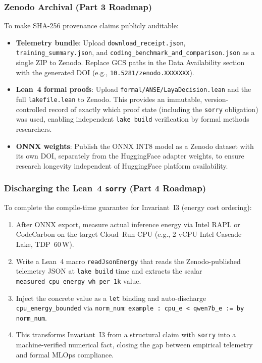 \documentclass[conference]{IEEEtran}
\begin{document}
\subsubsection{Zenodo Archival (Part 3 Roadmap)}

To make SHA-256 provenance claims publicly auditable:
\begin{itemize}
  \item \textbf{Telemetry bundle}: Upload \texttt{download\_receipt.json},
        \texttt{training\_summary.json}, and \texttt{coding\_benchmark\_and\_comparison.json}
        as a single ZIP to Zenodo. Replace GCS paths in the Data Availability section with
        the generated DOI (e.g., \texttt{10.5281/zenodo.XXXXXXX}).
  \item \textbf{Lean~4 formal proofs}: Upload \texttt{formal/ANSE/LayaDecision.lean} and
        the full \texttt{lakefile.lean} to Zenodo. This provides an immutable, version-controlled
        record of exactly which proof state (including the \texttt{sorry} obligation) was used,
        enabling independent \texttt{lake build} verification by formal methods researchers.
  \item \textbf{ONNX weights}: Publish the ONNX INT8 model as a Zenodo dataset with
        its own DOI, separately from the HuggingFace adapter weights, to ensure research
        longevity independent of HuggingFace platform availability.
\end{itemize}

\subsubsection{Discharging the Lean~4 \texttt{sorry} (Part 4 Roadmap)}

To complete the compile-time guarantee for Invariant~I3 (energy cost ordering):
\begin{enumerate}
  \item After ONNX export, measure actual inference energy via Intel RAPL or CodeCarbon
        on the target Cloud~Run CPU (e.g., 2 vCPU Intel Cascade Lake, TDP~60\,W).
  \item Write a Lean~4 macro \texttt{readJsonEnergy} that reads the Zenodo-published
        telemetry JSON at \texttt{lake build} time and extracts the scalar
        \texttt{measured\_cpu\_energy\_wh\_per\_1k} value.
  \item Inject the concrete value as a \texttt{let} binding and auto-discharge
        \texttt{cpu\_energy\_bounded} via \texttt{norm\_num}:
        \texttt{example : cpu\_e < qwen7b\_e := by norm\_num}.
  \item This transforms Invariant~I3 from a structural claim with \texttt{sorry}
        into a machine-verified numerical fact, closing the gap between empirical
        telemetry and formal MLOps compliance.
\end{enumerate}
\end{document}
